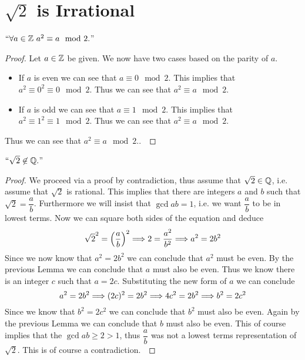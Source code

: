     \section{$\sqrt{2}$ is Irrational}
        \begin{lemma}
            $``\forall a \in \mathbb{Z} \ a^2 \equiv a \mod 2.$''
        \end{lemma}
        \begin{proof}
            Let $a \in \mathbb{Z}$ be given. We now have two cases based on the parity of $a$.
            \begin{itemize}
                \item
                    If $a$ is even we can see that $a \equiv 0 \mod 2$. This implies that
                    $a^2 \equiv 0^2 \equiv 0 \mod 2$. Thus we can see that $a^2 \equiv a \mod 2$.
                \item
                    If $a$ is odd we can see that $a \equiv 1 \mod 2$. This implies that
                    $a^2 \equiv 1^2 \equiv 1 \mod 2$. Thus we can see that $a^2 \equiv a \mod 2$.
            \end{itemize}
            Thus we can see that $a^2 \equiv a \mod 2.$.~\QED
        \end{proof}
        \begin{theorem}
            $``\sqrt{2} \not\in \mathbb{Q}.$''
        \end{theorem}
        \begin{proof}
            We proceed via a proof by contradiction, thus assume that $\sqrt{2} \in \mathbb{Q}$,
            i.e. assume that $\sqrt{2}$ is rational. This implies that there are integers
            $a$ and $b$ such that $\sqrt{2} = \dfrac{a}{b}$. Furthermore we will insist that
            $\gcd{a}{b} = 1$, i.e. we want $\dfrac{a}{b}$ to be in lowest terms. Now we can square
            both sides of the equation and deduce 
            \[
                \sqrt{2}^2 = \left(\dfrac{a}{b}\right)^2 \Longrightarrow 2 = \dfrac{a^2}{b^2} \Longrightarrow a^2 = 2b^2
            \]
            Since we now know that $a^2 = 2b^2$ we can conclude that $a^2$ must be even. By the
            previous Lemma we can conclude that $a$ must also be even. Thus we know there is an
            integer $c$ such that $a = 2c$. Substituting the new form of $a$ we can conclude
            \[
                a^2 = 2b^2 \Longrightarrow (2c)^2 = 2b^2 \Longrightarrow 4c^2 = 2b^2 \Longrightarrow b^2 = 2c^2
            \]
            Since we know that $b^2 = 2c^2$ we can conclude that $b^2$ must also be even. Again
            by the previous Lemma we can conclude that $b$ must also be even. This of course implies
            that the $\gcd{a}{b} \ge 2 > 1$, thus $\dfrac{a}{b}$ was not a lowest terms representation
            of $\sqrt{2}$. This is of course a contradiction.~\QED
        \end{proof}
